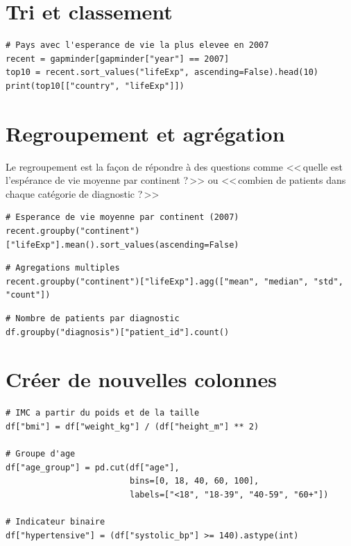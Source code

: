 \section{Tri et classement}

\begin{verbatim}
# Pays avec l'esperance de vie la plus elevee en 2007
recent = gapminder[gapminder["year"] == 2007]
top10 = recent.sort_values("lifeExp", ascending=False).head(10)
print(top10[["country", "lifeExp"]])
\end{verbatim}

\section{Regroupement et agr\'egation}

Le regroupement est la fa\c{c}on de r\'epondre \`a des questions comme <<\,quelle est l'esp\'erance de vie moyenne par continent ?\,>> ou <<\,combien de patients dans chaque cat\'egorie de diagnostic ?\,>>

\begin{verbatim}
# Esperance de vie moyenne par continent (2007)
recent.groupby("continent")["lifeExp"].mean().sort_values(ascending=False)
\end{verbatim}

\begin{verbatim}
# Agregations multiples
recent.groupby("continent")["lifeExp"].agg(["mean", "median", "std", "count"])
\end{verbatim}

\begin{verbatim}
# Nombre de patients par diagnostic
df.groupby("diagnosis")["patient_id"].count()
\end{verbatim}

\section{Cr\'eer de nouvelles colonnes}

\begin{verbatim}
# IMC a partir du poids et de la taille
df["bmi"] = df["weight_kg"] / (df["height_m"] ** 2)

# Groupe d'age
df["age_group"] = pd.cut(df["age"],
                         bins=[0, 18, 40, 60, 100],
                         labels=["<18", "18-39", "40-59", "60+"])

# Indicateur binaire
df["hypertensive"] = (df["systolic_bp"] >= 140).astype(int)
\end{verbatim}

